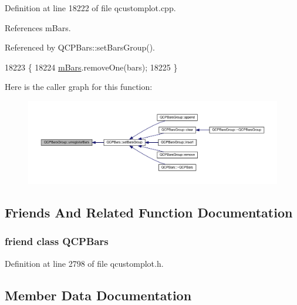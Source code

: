 Definition at line 18222 of file qcustomplot.\+cpp.



References m\+Bars.



Referenced by Q\+C\+P\+Bars\+::set\+Bars\+Group().


\begin{DoxyCode}
18223 \{
18224   \hyperlink{class_q_c_p_bars_group_affdb1e9233c277ff5a4c0a1121cf1fc0}{mBars}.removeOne(bars);
18225 \}
\end{DoxyCode}


Here is the caller graph for this function\+:\nopagebreak
\begin{figure}[H]
\begin{center}
\leavevmode
\includegraphics[width=350pt]{class_q_c_p_bars_group_ac7073cdd7b1a40c6cb4b5f908145f8c4_icgraph}
\end{center}
\end{figure}




\subsection{Friends And Related Function Documentation}
\hypertarget{class_q_c_p_bars_group_a721b87c7cdb8e83a90d77fc8a22e7195}{}
\subsubsection[{Q\+C\+P\+Bars}]{\setlength{\rightskip}{0pt plus 5cm}friend class {\bf Q\+C\+P\+Bars}\hspace{0.3cm}{\ttfamily [friend]}}\label{class_q_c_p_bars_group_a721b87c7cdb8e83a90d77fc8a22e7195}


Definition at line 2798 of file qcustomplot.\+h.



\subsection{Member Data Documentation}
\hypertarget{class_q_c_p_bars_group_affdb1e9233c277ff5a4c0a1121cf1fc0}{}
